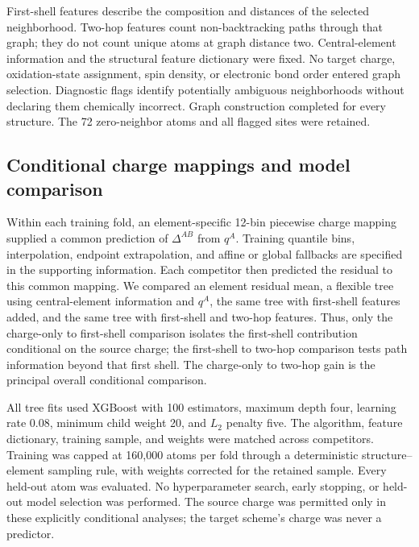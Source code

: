 First-shell features describe the composition and distances of the selected neighborhood. Two-hop features count non-backtracking paths through that graph; they do not count unique atoms at graph distance two. Central-element information and the structural feature dictionary were fixed. No target charge, oxidation-state assignment, spin density, or electronic bond order entered graph selection. Diagnostic flags identify potentially ambiguous neighborhoods without declaring them chemically incorrect. Graph construction completed for every structure. The 72 zero-neighbor atoms and all flagged sites were retained.

\subsection{Conditional charge mappings and model comparison}
Within each training fold, an element-specific 12-bin piecewise charge mapping supplied a common prediction of $\Delta^{AB}$ from $q^A$. Training quantile bins, interpolation, endpoint extrapolation, and affine or global fallbacks are specified in the supporting information. Each competitor then predicted the residual to this common mapping. We compared an element residual mean, a flexible tree using central-element information and $q^A$, the same tree with first-shell features added, and the same tree with first-shell and two-hop features. Thus, only the charge-only to first-shell comparison isolates the first-shell contribution conditional on the source charge; the first-shell to two-hop comparison tests path information beyond that first shell. The charge-only to two-hop gain is the principal overall conditional comparison.

All tree fits used XGBoost\cite{Chen2016} with 100 estimators, maximum depth four, learning rate 0.08, minimum child weight 20, and $L_2$ penalty five. The algorithm, feature dictionary, training sample, and weights were matched across competitors. Training was capped at 160,000 atoms per fold through a deterministic structure--element sampling rule, with weights corrected for the retained sample. Every held-out atom was evaluated. No hyperparameter search, early stopping, or held-out model selection was performed. The source charge was permitted only in these explicitly conditional analyses; the target scheme's charge was never a predictor.

